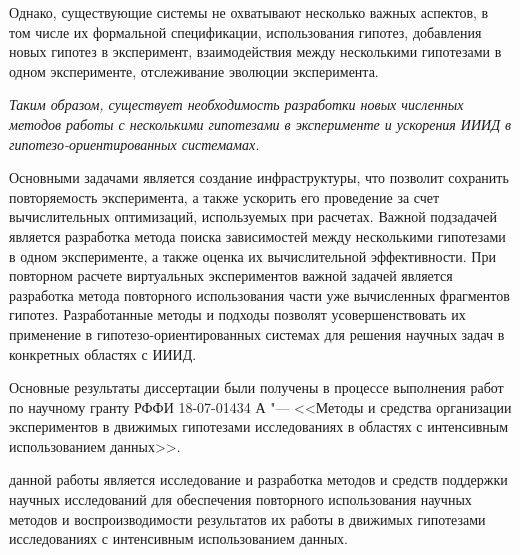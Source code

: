 Однако, существующие системы не охватывают несколько важных аспектов, в том числе их формальной спецификации, 
использования гипотез, добавления новых гипотез в эксперимент, взаимодействия между несколькими гипотезами в 
одном эксперименте, отслеживание эволюции эксперимента. 

\textit{Таким образом, существует необходимость разработки новых численных методов работы с несколькими гипотезами 
в эксперименте и ускорения ИИИД в гипотезо-ориентированных системамах. }
 
Основными задачами является создание инфраструктуры, что позволит сохранить повторяемость эксперимента, а 
также ускорить его проведение за счет вычислительных оптимизаций, используемых при расчетах. Важной подзадачей 
является разработка метода поиска зависимостей между несколькими гипотезами в одном эксперименте, а также оценка 
их вычислительной эффективности. При повторном расчете виртуальных экспериментов важной задачей является разработка 
метода повторного использования части уже вычисленных фрагментов гипотез. Разработанные методы и подходы позволят 
усовершенствовать их применение в гипотезо-ориентированных системах для решения научных задач 
в конкретных областях с ИИИД.

Основные результаты диссертации были получены в процессе выполнения работ по научному гранту 
РФФИ 18-07-01434 А "--- <<Методы и средства организации экспериментов в движимых гипотезами исследованиях 
в областях с интенсивным использованием данных>>.



{\aim} данной работы является исследование и разработка методов и средств поддержки научных 
исследований для обеспечения повторного использования научных методов и воспроизводимости результатов 
их работы в движимых гипотезами исследованиях с интенсивным использованием данных.


